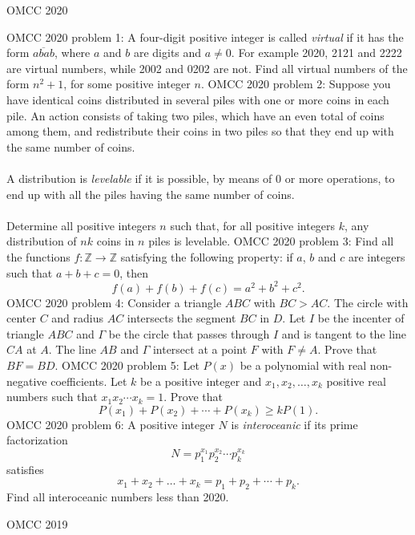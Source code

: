 OMCC 2020 

OMCC 2020 problem 1:  A four-digit positive integer is called \textit{virtual} if it has the form $\overline{abab}$, where $a$ and $b$ are digits and $a \neq 0$. For example 2020, 2121 and 2222 are virtual numbers, while 2002 and 0202 are not. Find all virtual numbers of the form $n^2+1$, for some positive integer $n$. 
OMCC 2020 problem 2:  Suppose you have identical coins distributed in several piles with one or more coins in each pile. An action consists of taking two piles, which have an even total of coins among them, and redistribute their coins in two piles so that they end up with the same number of coins. \\\\
A distribution is \textit{levelable} if it is possible, by means of 0 or more operations, to end up with all the piles having the same number of coins. \\\\
Determine all positive integers $n$ such that, for all positive integers $k$, any distribution of $nk$ coins in $n$ piles is levelable. 
OMCC 2020 problem 3:  Find all the functions $f: \mathbb{Z}\to \mathbb{Z}$ satisfying the following property: if $a$, $b$ and $c$ are integers such that $a+b+c=0$, then
\[ f(a)+f(b)+f(c)=a^2+b^2+c^2. \] 
OMCC 2020 problem 4:  Consider a triangle $ABC$ with $BC>AC$. The circle with center $C$ and radius $AC$ intersects the segment $BC$ in $D$. Let $I$ be the incenter of triangle $ABC$ and $\Gamma$ be the circle that passes through $I$ and is tangent to the line $CA$ at $A$. The line $AB$ and $\Gamma$ intersect at a point $F$ with $F \neq A$. Prove that $BF=BD$. 
OMCC 2020 problem 5:  Let $P(x)$ be a polynomial with real non-negative coefficients. Let $k$ be a positive integer and $x_1, x_2, \dots, x_k$ positive real numbers such that $x_1x_2\cdots x_k=1$. Prove that
\[ P(x_1)+P(x_2)+\cdots+P(x_k)\geq kP(1). \] 
OMCC 2020 problem 6:  A positive integer $N$ is \textit{interoceanic} if its prime factorization
\[ N=p_1^{x_1}p_2^{x_2}\cdots p_k^{x_k} \]
satisfies
\[ x_1+x_2+\dots +x_k=p_1+p_2+\cdots +p_k. \]
Find all interoceanic numbers less than 2020. 

OMCC 2019 

